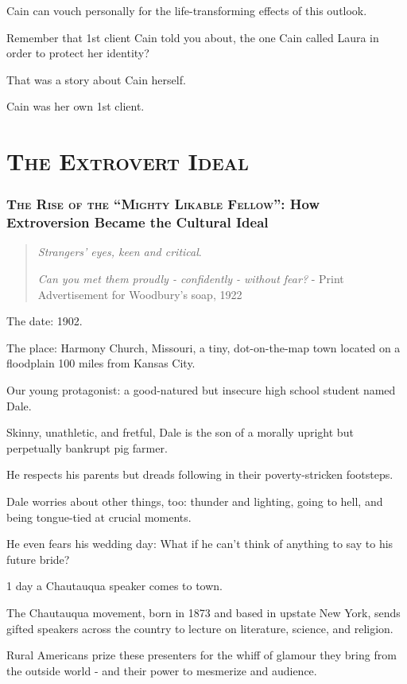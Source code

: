 \documentclass[oneside]{article}
\numberwithin{equation}{section}
\begin{document}
Cain can vouch personally for the life-transforming effects of this outlook.

Remember that 1st client Cain told you about, the one Cain called Laura in order to protect her identity?

%
That was a story about Cain herself.

Cain was her own 1st client.


\part{\textsc{The Extrovert Ideal}}

\section{\textsc{The Rise of the ``Mighty Likable Fellow''}: How Extroversion Became the Cultural Ideal}
\begin{quotation}
    \textit{Strangers' eyes, keen and critical}.
    
    \textit{Can you met them proudly - confidently - without fear?} - Print Advertisement for Woodbury's soap, 1922
\end{quotation}
The date: 1902.

The place: Harmony Church, Missouri, a tiny, dot-on-the-map town located on a floodplain 100 miles from Kansas City.

Our young protagonist: a good-natured but insecure high school student named Dale.

%
Skinny, unathletic, and fretful, Dale is the son of a morally upright but perpetually bankrupt pig farmer.

He respects his parents but dreads following in their poverty-stricken footsteps.

Dale worries about other things, too: thunder and lighting, going to hell, and being tongue-tied at crucial moments.

He even fears his wedding day: What if he can't think of anything to say to his future bride?

%
1 day a Chautauqua speaker comes to town.

The Chautauqua movement, born in 1873 and based in upstate New York, sends gifted speakers across the country to lecture on literature, science, and religion.

Rural Americans prize these presenters for the whiff of glamour they bring from the outside world - and their power to mesmerize and audience.
\end{document}
